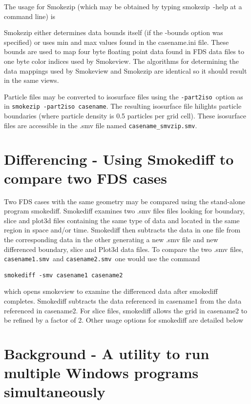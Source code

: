 \documentclass[11pt,twoside]{book}
\begin{document}
The usage for Smokezip (which may be obtained by typing smokezip~-help at a command line) is
{
\scriptsize

}

Smokezip either determines data bounds itself (if the -bounds option was specified)
or uses min and max values found in the casename.ini
file.  These bounds are used to map four byte floating point data
found in FDS data files to one byte color indices used by
Smokeview.  The algorithms for determining
the data mappings used by Smokeview and Smokezip are identical so it
should result in the same views.

Particle files may be converted to isosurface files using the
{\tt -part2iso}\ option as in {\tt smokezip -part2iso casename}.  The resulting isosurface file hilights
particle boundaries (where particle density is 0.5 particles per grid cell).
These isosurface files are accessible in the .smv file named {\tt casename\_smvzip.smv}.

\section{Differencing - Using Smokediff to compare two FDS cases}

Two FDS cases with the same geometry may be compared using the stand-alone
program smokediff.  Smokediff examines two .smv files files looking for boundary, slice and plot3d files containing the same type of data and located in the same region in space and/or time.  Smokediff then subtracts the data in one file from the corresponding data in the other generating a new .smv file and new differenced boundary, slice and Plot3d data files.  To compare the two .smv files, {\tt casename1.smv}\ and {\tt casename2.smv}\ one would use the command

\begin{verbatim}
smokediff -smv casename1 casename2
\end{verbatim}

\noindent which opens smokeview to examine the differenced data after smokediff completes.  Smokediff subtracts the data referenced in casename1 from the data referenced in casename2.   For slice files, smokediff allows the grid in casename2 to be refined by a factor of 2.  Other usage options for smokediff are detailed below

{
\scriptsize

}

\section{Background - A utility to run multiple Windows programs simultaneously}
\end{document}
